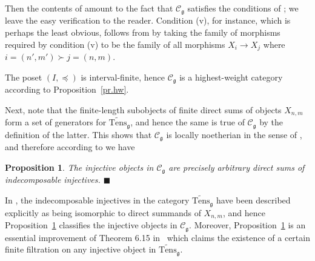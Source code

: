 \documentclass[11pt]{article}
\theoremstyle{plain}
\newtheorem{proposition}[lemma]{Proposition}
\theoremstyle{nonumberplain}
\theoremstyle{plain}
\theoremstyle{nonumberplain}
\newcommand\cC{\mathcal C}
\newcommand\fg{\mathfrak{g}}
\newcommand{\qedhere}{\mbox{}\hfill\ensuremath{\blacksquare}}
\begin{document}
Then the contents of
\cite[$\S$6]{PS1} amount to the fact that $\cC_\fg$ satisfies the
conditions of ; we leave the easy verification to the
reader. Condition (v), for instance, which is perhaps the least
obvious, follows from \cite[Lemma 6.6]{PS1} by taking the family of morphisms
required by condition (v) to be the family of all morphisms $X_i \to X_j$ where $i=(n',m') \succ j=(n,m)$.



%
%
%


The poset $(I,\preceq)$ is interval-finite, hence $\mathcal{C}_\fg$ is a highest-weight category according to Proposition~\ref{pr.hw}.  

Next, note that the finite-length subobjects of finite direct sums of objects $X_{n,m}$ form a set of
generators for {$\widetilde{\mathrm{Tens}}_\fg$}, and hence the same is true of $\cC_\fg$ by the
definition of the latter. This shows that $\cC_\fg$ is locally
noetherian in the sense of , and {therefore}
according to  we have


\begin{proposition}
  The injective objects in $\cC_\fg$ are precisely {arbitrary} direct sums
  of indecomposable {injectives.}  \qedhere
\label{prop_inj}
\end{proposition}

{In \cite[Corollary 6.7]{PS1}, the indecomposable injectives in the
  category $\widetilde{\mathrm{Tens}}_\fg$ have been described explicitly as being
  isomorphic to direct summands of $X_{n,m}$, and hence
  Proposition~\ref{prop_inj} classifies the injective objects in
  $\cC_\fg$.}  Moreover, Proposition~\ref{prop_inj} is an essential
improvement of Theorem 6.15 in~\cite{PS1} which claims the existence of a
certain finite filtration on any injective object in
$\widetilde{\mathrm{Tens}}_\fg$.



\end{document}
